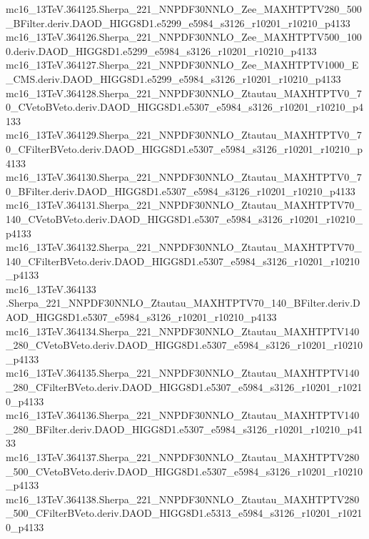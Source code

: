 \begin{footnotesize}
mc16\_13TeV.364125.Sherpa\_221\_NNPDF30NNLO\_Zee\_MAXHTPTV280\_500\_BFilter.deriv.DAOD\_HIGG8D1.e5299\_e5984\_s3126\_r10201\_r10210\_p4133 \\
mc16\_13TeV.364126.Sherpa\_221\_NNPDF30NNLO\_Zee\_MAXHTPTV500\_1000.deriv.DAOD\_HIGG8D1.e5299\_e5984\_s3126\_r10201\_r10210\_p4133 \\
mc16\_13TeV.364127.Sherpa\_221\_NNPDF30NNLO\_Zee\_MAXHTPTV1000\_E\_CMS.deriv.DAOD\_HIGG8D1.e5299\_e5984\_s3126\_r10201\_r10210\_p4133 \\
mc16\_13TeV.364128.Sherpa\_221\_NNPDF30NNLO\_Ztautau\_MAXHTPTV0\_70\_CVetoBVeto.deriv.DAOD\_HIGG8D1.e5307\_e5984\_s3126\_r10201\_r10210\_p4133 \\
mc16\_13TeV.364129.Sherpa\_221\_NNPDF30NNLO\_Ztautau\_MAXHTPTV0\_70\_CFilterBVeto.deriv.DAOD\_HIGG8D1.e5307\_e5984\_s3126\_r10201\_r10210\_p4133 \\
mc16\_13TeV.364130.Sherpa\_221\_NNPDF30NNLO\_Ztautau\_MAXHTPTV0\_70\_BFilter.deriv.DAOD\_HIGG8D1.e5307\_e5984\_s3126\_r10201\_r10210\_p4133 \\
mc16\_13TeV.364131.Sherpa\_221\_NNPDF30NNLO\_Ztautau\_MAXHTPTV70\_140\_CVetoBVeto.deriv.DAOD\_HIGG8D1.e5307\_e5984\_s3126\_r10201\_r10210\_p4133 \\
mc16\_13TeV.364132.Sherpa\_221\_NNPDF30NNLO\_Ztautau\_MAXHTPTV70\_140\_CFilterBVeto.deriv.DAOD\_HIGG8D1.e5307\_e5984\_s3126\_r10201\_r10210\_p4133 \\
mc16\_13TeV.364133 \\.Sherpa\_221\_NNPDF30NNLO\_Ztautau\_MAXHTPTV70\_140\_BFilter.deriv.DAOD\_HIGG8D1.e5307\_e5984\_s3126\_r10201\_r10210\_p4133 \\
mc16\_13TeV.364134.Sherpa\_221\_NNPDF30NNLO\_Ztautau\_MAXHTPTV140\_280\_CVetoBVeto.deriv.DAOD\_HIGG8D1.e5307\_e5984\_s3126\_r10201\_r10210\_p4133 \\
mc16\_13TeV.364135.Sherpa\_221\_NNPDF30NNLO\_Ztautau\_MAXHTPTV140\_280\_CFilterBVeto.deriv.DAOD\_HIGG8D1.e5307\_e5984\_s3126\_r10201\_r10210\_p4133 \\
mc16\_13TeV.364136.Sherpa\_221\_NNPDF30NNLO\_Ztautau\_MAXHTPTV140\_280\_BFilter.deriv.DAOD\_HIGG8D1.e5307\_e5984\_s3126\_r10201\_r10210\_p4133 \\
mc16\_13TeV.364137.Sherpa\_221\_NNPDF30NNLO\_Ztautau\_MAXHTPTV280\_500\_CVetoBVeto.deriv.DAOD\_HIGG8D1.e5307\_e5984\_s3126\_r10201\_r10210\_p4133 \\
mc16\_13TeV.364138.Sherpa\_221\_NNPDF30NNLO\_Ztautau\_MAXHTPTV280\_500\_CFilterBVeto.deriv.DAOD\_HIGG8D1.e5313\_e5984\_s3126\_r10201\_r10210\_p4133 \\

\end{footnotesize}
